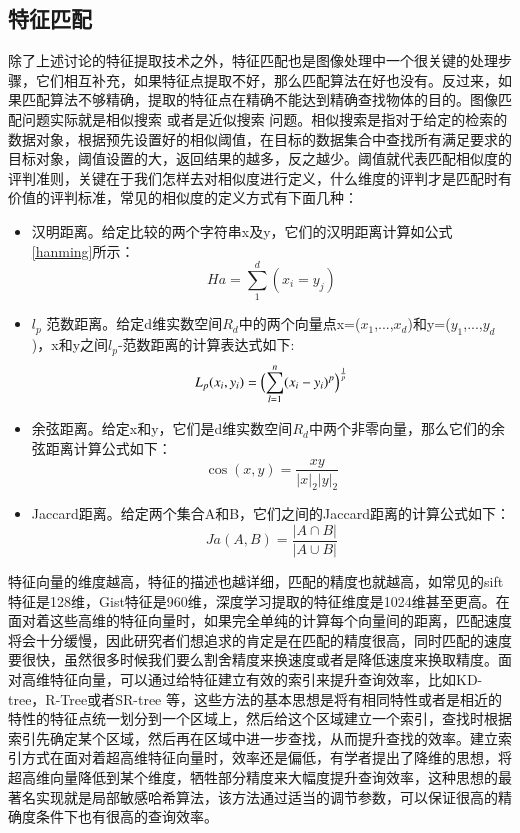 \subsection{特征匹配}
除了上述讨论的特征提取技术之外，特征匹配也是图像处理中一个很关键的处理步骤，它们相互补充，如果特征点提取不好，那么匹配算法在好也没有。反过来，如果匹配算法不够精确，提取的特征点在精确不能达到精确查找物体的目的。图像匹配问题实际就是相似搜索 或者是近似搜索 问题。相似搜索是指对于给定的检索的数据对象，根据预先设置好的相似阈值，在目标的数据集合中查找所有满足要求的目标对象，阈值设置的大，返回结果的越多，反之越少。阈值就代表匹配相似度的评判准则，关键在于我们怎样去对相似度进行定义，什么维度的评判才是匹配时有价值的评判标准，常见的相似度的定义方式有下面几种：
\begin{itemize}
\item 汉明距离。给定比较的两个字符串x及y，它们的汉明距离计算如公式\ref{hanming}所示：
\begin{equation}\label{hanming}
Ha=\sum_{1}^d(x_i=y_j)
\end{equation}

\item $l_p$ 范数距离。给定d维实数空间$R_d$中的两个向量点x=($x_1$,...,$x_d$)和y=($y_1$,...,$y_d$)，x和y之间$l_p$-范数距离的计算表达式如下:
\begin{equation}\label{fanshu}
L_p(x_i,y_i)=\Bigl(\sum_{l=1}^n(x_i-y_i)^p\Bigr)^\frac{1}{p}
\end{equation}

\item 余弦距离。给定x和y，它们是d维实数空间$R_d$中两个非零向量，那么它们的余弦距离计算公式如下：
\begin{equation}\label{yuxian}
\cos(x,y)=\frac{xy}{|x|_2|y|_2}
\end{equation}

\item Jaccard距离。给定两个集合A和B，它们之间的Jaccard距离的计算公式如下：
\begin{equation}\label{Jaccard}
Ja(A,B)=\frac{|{A}\cap{B}|}{|{A}\cup{B}|}
\end{equation}
\end{itemize}

特征向量的维度越高，特征的描述也越详细，匹配的精度也就越高，如常见的sift特征是128维，Gist特征是960维，深度学习提取的特征维度是1024维甚至更高。在面对着这些高维的特征向量时，如果完全单纯的计算每个向量间的距离，匹配速度将会十分缓慢，因此研究者们想追求的肯定是在匹配的精度很高，同时匹配的速度要很快，虽然很多时候我们要么割舍精度来换速度或者是降低速度来换取精度。面对高维特征向量，可以通过给特征建立有效的索引来提升查询效率，比如KD-tree，R-Tree或者SR-tree 等，这些方法的基本思想是将有相同特性或者是相近的特性的特征点统一划分到一个区域上，然后给这个区域建立一个索引，查找时根据索引先确定某个区域，然后再在区域中进一步查找，从而提升查找的效率。建立索引方式在面对着超高维特征向量时，效率还是偏低，有学者提出了降维的思想，将超高维向量降低到某个维度，牺牲部分精度来大幅度提升查询效率，这种思想的最著名实现就是局部敏感哈希算法，该方法通过适当的调节参数，可以保证很高的精确度条件下也有很高的查询效率。

